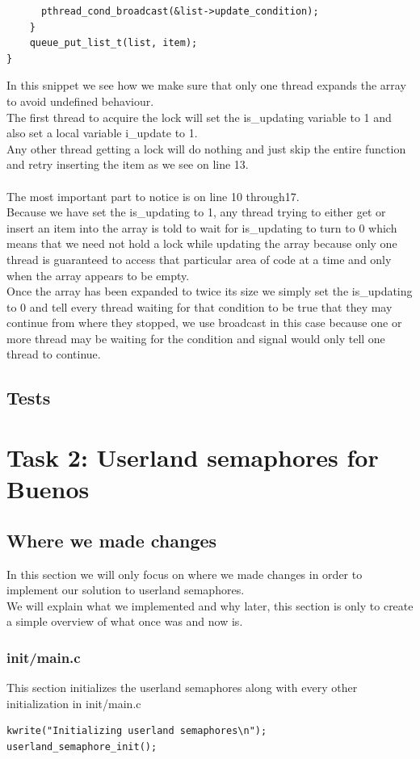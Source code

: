 \documentclass[a4paper,12pt,danish]{report}
\begin{document}
\begin{itemize}
\begin{lstlisting}
      pthread_cond_broadcast(&list->update_condition);
    }
    queue_put_list_t(list, item);
}
\end{lstlisting}
In this snippet we see how we make sure that only one thread expands the array to avoid undefined behaviour.
\\
The first thread to acquire the lock will set the is\_updating variable to 1 and also set a local variable i\_update to 1.
\\
Any other thread getting a lock will do nothing and just skip the entire function and retry inserting the item as we see on line 13.
\\
\\
The most important part to notice is on line 10 through17.
\\
Because we have set the is\_updating to 1, any thread trying to either get or insert an item into the array is told to wait for is\_updating to turn to 0 which means that we need not hold a lock while updating the array because only one thread is guaranteed to access that particular area of code at a time and only when the array appears to be empty.
\\
Once the array has been expanded to twice its size we simply set the is\_updating to 0 and tell every thread waiting for that condition to be true that they may continue from where they stopped, we use broadcast in this case because one or more thread may be waiting for the condition and signal would only tell one thread to continue.
\end{itemize}
\subsection{Tests}
\section{Task 2: Userland semaphores for Buenos}
\subsection{Where we made changes}
In this section we will only focus on where we made changes in order to implement our solution to userland semaphores.
\\
We will explain what we implemented and why later, this section is only to create a simple overview of what once was and now is.
\subsubsection{init/main.c}
This section initializes the userland semaphores along with every other initialization in init/main.c
\begin{verbatim}
kwrite("Initializing userland semaphores\n");
userland_semaphore_init();
\end{verbatim}
\end{document}
